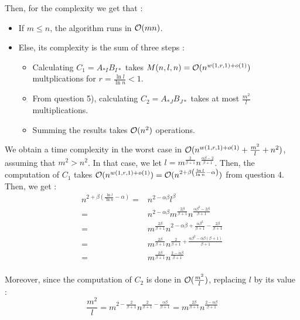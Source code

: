 \documentclass{cours}
\begin{document}
        Then, for the complexity we get that :
        \begin{itemize}
            \item If $m \leq n$, the algorithm runs in $\mathcal{O}(mn)$.
            \item Else, its complexity is the sum of three steps :
            \begin{itemize}
                \item Calculating $C_{1} = A_{*I}B_{I*}$ takes $M(n, l, n) = \mathcal{O}(n^{w(1, r, 1) + o(1)})$ multplications for $r = \frac{\ln l}{\ln n} < 1$.
                \item From question 5), calculating $C_{2} = A_{*J}B_{J*}$ takes at most $\frac{m^{2}}{l}$ multiplications.
                \item Summing the results takes $\mathcal{O}(n^{2})$ operations.
            \end{itemize}
        \end{itemize}

        We obtain a time complexity in the worst case in $\mathcal{O}(n^{w(1, r, 1) + o(1)} + \frac{m^{2}}{l} + n^{2})$, assuming that $m^{2} > n^{2}$.
        In that case, we let $l = m^{\frac{2}{\beta + 1}}n^{\frac{\alpha\beta - 2}{\beta + 1}}$.
        Then, the computation of $C_{1}$ takes $\mathcal{O}(n^{w(1, r, 1) + o(1)}) = \mathcal{O}(n^{2 + \beta\left(\frac{\ln l}{\ln n} - \alpha\right)})$ from question 4. Then, we get :
        \[
            \begin{aligned}
                n^{2 + \beta\left(\frac{\ln l}{\ln n} - \alpha\right)} =& n^{2 - \alpha\beta} l^{\beta} \\
                =& n^{2 - \alpha\beta}m^{\frac{2\beta}{\beta + 1}}n^{\frac{\alpha\beta^{2} - 2\beta}{\beta + 1}}\\
                =& m^{\frac{2\beta}{\beta + 1}}n^{2 - \alpha\beta + \frac{\alpha\beta^{2}}{\beta + 1} - \frac{2 \beta}{\beta + 1}}\\
                =& m^{\frac{2\beta}{\beta + 1}}n^{\frac{2}{\beta+1} + \frac{\alpha\beta^{2} - \alpha\beta\left(\beta + 1\right)}{\beta + 1}}\\
                =& m^{\frac{2\beta}{\beta + 1}}n^{\frac{2 - \alpha \beta}{\beta + 1}}\\
            \end{aligned}
        \]

        Moreover, since the computation of $C_{2}$ is done in $\mathcal{O}(\frac{m^{2}}{l})$, replacing $l$ by its value :
        \[
            \frac{m^{2}}{l} = m^{2 - \frac{2}{\beta + 1}}n^{\frac{2}{\beta + 1} - \frac{\alpha \beta}{\beta + 1}} = m^{\frac{2\beta}{\beta + 1}}n^{\frac{2 - \alpha\beta}{\beta + 1}}
        \]
\end{document}
